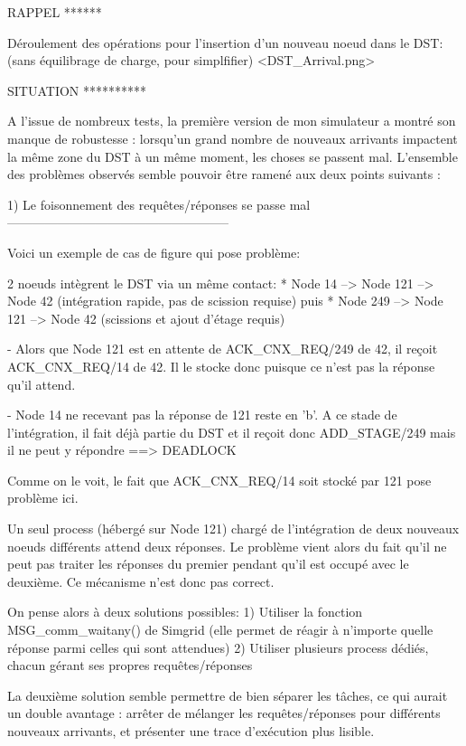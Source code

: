 RAPPEL
******

Déroulement des opérations pour l'insertion d'un nouveau noeud dans le DST: (sans équilibrage de
charge, pour simplfifier)
<DST_Arrival.png>


SITUATION
**********

A l'issue de nombreux tests, la première version de mon simulateur a montré son manque de robustesse
: lorsqu'un grand nombre de nouveaux arrivants impactent la même zone du DST à un même moment, les
choses se passent mal.
L'ensemble des problèmes observés semble pouvoir être ramené aux deux points suivants :

1) Le foisonnement des requêtes/réponses se passe mal
-----------------------------------------------------

Voici un exemple de cas de figure qui pose problème:

2 noeuds intègrent le DST via un même contact:
 * Node 14 --> Node 121 --> Node 42 (intégration rapide, pas de scission requise)
   puis
 * Node 249 --> Node 121 --> Node 42 (scissions et ajout d'étage requis)

 - Alors que Node 121 est en attente de ACK_CNX_REQ/249 de 42, il reçoit ACK_CNX_REQ/14 de 42. Il le
   stocke donc puisque ce n'est pas la réponse qu'il attend.

 - Node 14 ne recevant pas la réponse de 121 reste en 'b'.
   A ce stade de l'intégration, il fait déjà partie du DST et il reçoit donc ADD_STAGE/249 mais il
   ne peut y répondre ==> DEADLOCK

Comme on le voit, le fait que ACK_CNX_REQ/14 soit stocké par 121 pose problème ici.

Un seul process (hébergé sur Node 121) chargé de l'intégration de deux nouveaux noeuds différents
attend deux réponses. Le problème vient alors du fait qu'il ne peut pas traiter les réponses du
premier pendant qu'il est occupé avec le deuxième. Ce mécanisme n'est donc pas correct.

On pense alors à deux solutions possibles:
1) Utiliser la fonction MSG_comm_waitany() de Simgrid
   (elle permet de réagir à n'importe quelle réponse parmi celles qui sont attendues)
2) Utiliser plusieurs process dédiés, chacun gérant ses propres requêtes/réponses

La deuxième solution semble permettre de bien séparer les tâches, ce qui aurait un double avantage :
arrêter de mélanger les requêtes/réponses pour différents nouveaux arrivants, et présenter une
trace d'exécution plus lisible.

